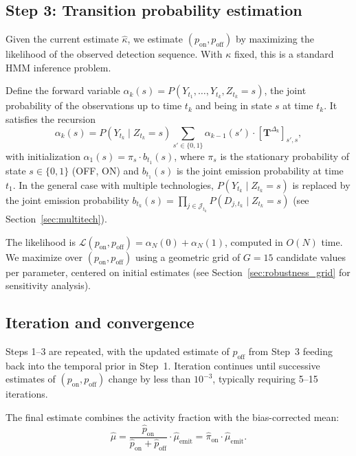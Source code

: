 \documentclass[11pt]{article}
\begin{document}
\subsection{Step 3: Transition probability estimation}
\label{sec:forward}

Given the current estimate $\hat{\kappa}$, we estimate $(p_{\text{on}}, p_{\text{off}})$ by maximizing the likelihood of the observed detection sequence. With $\kappa$ fixed, this is a standard HMM inference problem.

Define the forward variable $\alpha_k(s) = P(Y_{t_1}, \ldots, Y_{t_k}, Z_{t_k} = s)$, the joint probability of the observations up to time $t_k$ and being in state $s$ at time $t_k$. It satisfies the recursion
\begin{equation}
    \alpha_k(s) = P(Y_{t_k} \mid Z_{t_k} = s) \sum_{s' \in \{0,1\}} \alpha_{k-1}(s') \cdot [\mathbf{T}^{\Delta_k}]_{s',s},
\end{equation}
with initialization $\alpha_1(s) = \pi_s \cdot b_{t_1}(s)$, where $\pi_s$ is the stationary probability of state $s\in\{0,1\}$ (OFF, ON) and $b_{t_1}(s)$ is the joint emission probability at time $t_1$. In the general case with multiple technologies, $P(Y_{t_k} \mid Z_{t_k} = s)$ is replaced by the joint emission probability $b_{t_k}(s) = \prod_{j \in \mathcal{J}_{t_k}} P(D_{j,t_k} \mid Z_{t_k} = s)$ (see Section~\ref{sec:multitech}).

The likelihood is $\mathcal{L}(p_{\text{on}}, p_{\text{off}}) = \alpha_N(0) + \alpha_N(1)$, computed in $O(N)$ time. We maximize over $(p_{\text{on}}, p_{\text{off}})$ using a geometric grid of $G = 15$ candidate values per parameter, centered on initial estimates (see Section~\ref{sec:robustness_grid} for sensitivity analysis).

\subsection{Iteration and convergence}

Steps 1--3 are repeated, with the updated estimate of $p_{\text{off}}$ from Step~3 feeding back into the temporal prior in Step~1. Iteration continues until successive estimates of $(p_{\text{on}}, p_{\text{off}})$ change by less than $10^{-3}$, typically requiring 5--15 iterations.

The final estimate combines the activity fraction with the bias-corrected mean:
\begin{equation}
    \hat{\mu} = \frac{\hat{p}_{\text{on}}}{\hat{p}_{\text{on}} + \hat{p}_{\text{off}}} \cdot \hat{\mu}_{\text{emit}} = \hat{\pi}_{\text{on}} \cdot \hat{\mu}_{\text{emit}}.
\end{equation}
\end{document}

